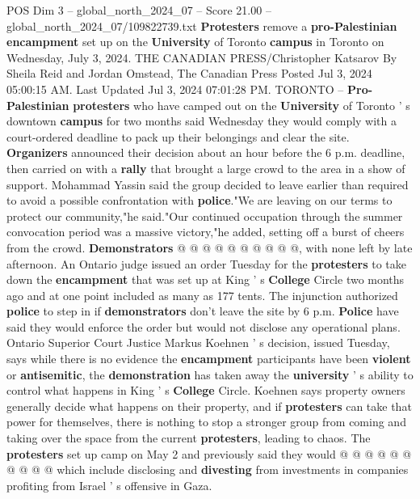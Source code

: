 \begin{textsample}{POS Dim 3 – global\_north\_2024\_07 – Score 21.00 – global\_north\_2024\_07/109822739.txt}  \label{ex:f3_pos_083}
\textbf{Protesters} remove a \textbf{pro-Palestinian} \textbf{encampment} set up on the \textbf{University} of Toronto \textbf{campus} in Toronto on Wednesday, July 3, 2024.
THE CANADIAN PRESS/Christopher Katsarov By Sheila Reid and Jordan Omstead, The Canadian Press Posted Jul 3, 2024 05:00:15 AM.
Last Updated Jul 3, 2024 07:01:28 PM.
TORONTO -- \textbf{Pro-Palestinian} \textbf{protesters} who have camped out on the \textbf{University} of Toronto ' s downtown \textbf{campus} for two months said Wednesday they would comply with a court-ordered deadline to pack up their belongings and clear the site. \textbf{Organizers} announced their decision about an hour before the 6 p.m. deadline, then carried on with a \textbf{rally} that brought a large crowd to the area in a show of support.
Mohammad Yassin said the group decided to leave earlier than required to avoid a possible confrontation with \textbf{police}."We are leaving on our terms to protect our community,"he said."Our continued occupation through the summer convocation period was a massive victory,"he added, setting off a burst of cheers from the crowd. \textbf{Demonstrators} @ @ @ @ @ @ @ @ @ @, with none left by late afternoon.
An Ontario judge issued an order Tuesday for the \textbf{protesters} to take down the \textbf{encampment} that was set up at King ' s \textbf{College} Circle two months ago and at one point included as many as 177 tents.
The injunction authorized \textbf{police} to step in if \textbf{demonstrators} don't leave the site by 6 p.m. \textbf{Police} have said they would enforce the order but would not disclose any operational plans.
Ontario Superior Court Justice Markus Koehnen ' s decision, issued Tuesday, says while there is no evidence the \textbf{encampment} participants have been \textbf{violent} or \textbf{antisemitic}, the \textbf{demonstration} has taken away the \textbf{university} ' s ability to control what happens in King ' s \textbf{College} Circle.
Koehnen says property owners generally decide what happens on their property, and if \textbf{protesters} can take that power for themselves, there is nothing to stop a stronger group from coming and taking over the space from the current \textbf{protesters}, leading to chaos.
The \textbf{protesters} set up camp on May 2 and previously said they would @ @ @ @ @ @ @ @ @ @ which include disclosing and \textbf{divesting} from investments in companies profiting from Israel ' s offensive in Gaza.

\end{textsample}
